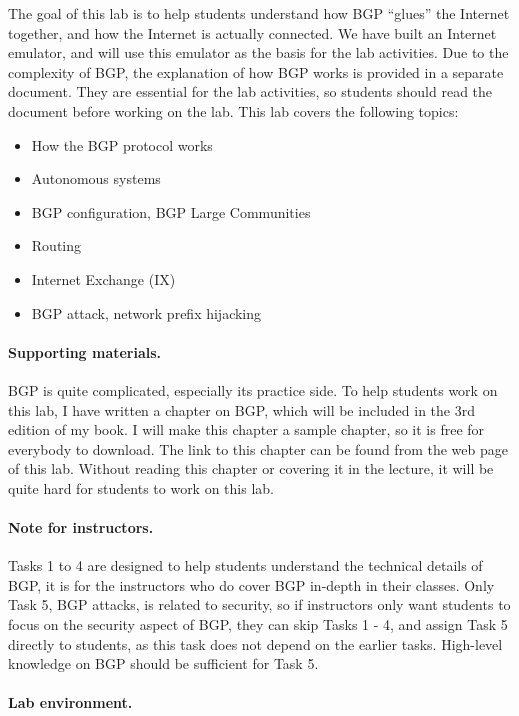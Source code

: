 The goal of this lab is to help students understand how
BGP ``glues'' the Internet together, and how the Internet is actually
connected. We have built an Internet emulator, and will 
use this emulator as the basis for the lab activities. Due to the 
complexity of BGP, the explanation of how BGP works is provided
in a separate document. They are essential for the lab activities, 
so students should read
the document before working on the lab. 
This lab covers the following topics:
\begin{itemize}[noitemsep]
\item How the BGP protocol works
\item Autonomous systems
\item BGP configuration, BGP Large Communities 
\item Routing 
\item Internet Exchange (IX)
\item BGP attack, network prefix hijacking
\end{itemize}


\paragraph{Supporting materials.}
BGP is quite complicated, especially its practice side.
To help students work on this lab, I have written a chapter on
BGP, which will be included in the 3rd edition of my book.
I will make this chapter a sample chapter, so it is free
for everybody to download. 
The link to this chapter can be found from the web page of this lab.
Without reading this chapter
or covering it in the lecture, it will be quite hard 
for students to work on this lab. 


\paragraph{Note for instructors.} 
Tasks 1 to 4 are designed to help students understand the technical 
details of BGP, it is for the instructors who do cover BGP in-depth in
their classes. Only Task 5, BGP attacks, is related to security,
so if instructors only want students to
focus on the security aspect of BGP, they can skip Tasks 1 - 4, and 
assign Task 5 directly to students, as this task
does not depend on the earlier tasks. 
High-level knowledge on BGP should be sufficient for Task 5.

\paragraph{Lab environment.} 
\seedenvironmentB
\nodependency




